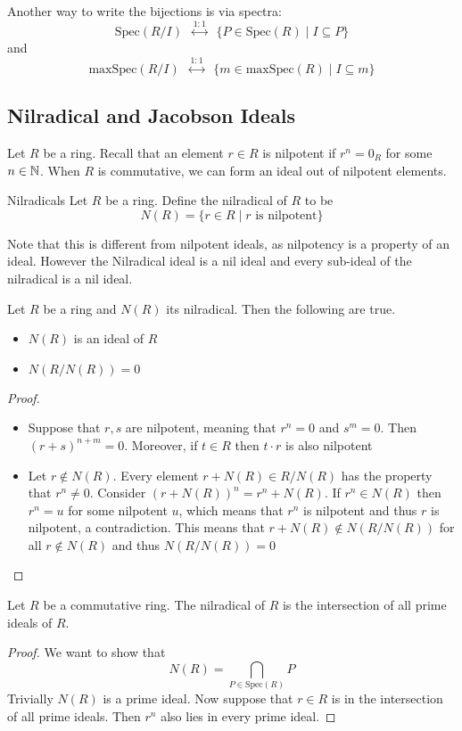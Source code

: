 \documentclass[a4paper]{article}
\begin{document}
Another way to write the bijections is via spectra: $$\text{Spec}(R/I)\;\;\overset{1:1}{\longleftrightarrow}\;\;\{P\in\text{Spec}(R)\;|\;I\subseteq P\}$$ and $$\text{maxSpec}(R/I)\;\;\overset{1:1}{\longleftrightarrow}\;\;\{m\in\text{maxSpec}(R)\;|\;I\subseteq m\}$$

\subsection{Nilradical and Jacobson Ideals}
Let $R$ be a ring. Recall that an element $r\in R$ is nilpotent if $r^n=0_R$ for some $n\in\mathbb{N}$. When $R$ is commutative, we can form an ideal out of nilpotent elements. 

\begin{defn}{Nilradicals}{} Let $R$ be a ring. Define the nilradical of $R$ to be $$N(R)=\{r\in R\;|\;r\text{ is nilpotent}\}$$
\end{defn}

Note that this is different from nilpotent ideals, as nilpotency is a property of an ideal. However the Nilradical ideal is a nil ideal and every sub-ideal of the nilradical is a nil ideal. 

\begin{prp}{}{} Let $R$ be a ring and $N(R)$ its nilradical. Then the following are true. 
\begin{itemize}
\item $N(R)$ is an ideal of $R$
\item $N(R/N(R))=0$
\end{itemize}\tcbline
\begin{proof}~\\
\begin{itemize}
\item Suppose that $r,s$ are nilpotent, meaning that $r^n=0$ and $s^m=0$. Then $(r+s)^{n+m}=0$. Moreover, if $t\in R$ then $t\cdot r$ is also nilpotent
\item Let $r\notin N(R)$. Every element $r+N(R)\in R/N(R)$ has the property that $r^n\neq 0$. Consider $(r+N(R))^n=r^n+N(R)$. If $r^n\in N(R)$ then $r^n=u$ for some nilpotent $u$, which means that $r^n$ is nilpotent and thus $r$ is nilpotent, a contradiction. This means that $r+N(R)\notin N(R/N(R))$ for all $r\notin N(R)$ and thus $N(R/N(R))=0$
\end{itemize}
\end{proof}
\end{prp}

\begin{prp}{}{} Let $R$ be a commutative ring. The nilradical of $R$ is the intersection of all prime ideals of $R$. \tcbline
\begin{proof}
We want to show that $$N(R)=\bigcap_{P\in\text{Spec}(R)}P$$
Trivially $N(R)$ is a prime ideal. Now suppose that $r\in R$ is in the intersection of all prime ideals. Then $r^n$ also lies in every prime ideal. 
\end{proof}
\end{prp}
\end{document}
